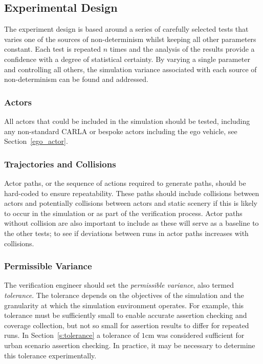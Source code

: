 \subsection{Experimental Design}\label{s:design_experiment}

The experiment design is based around a series of carefully selected tests that varies one of the sources of non-determinism whilst keeping all other parameters constant. Each test is repeated $n$ times and the analysis of the results provide a confidence with a degree of statistical certainty. By varying a single parameter and controlling all others, the simulation variance associated with each source of non-determinism can be found and addressed. 

\subsubsection{Actors} \label{s:actors}

All actors that could be included in the simulation should be tested, including any non-standard CARLA or bespoke actors including the ego vehicle, see Section~\ref{ego_actor}. 

\subsubsection{Trajectories and Collisions} 
Actor paths, or the sequence of actions required to generate paths, should be hard-coded to ensure repeatability. These paths should include collisions between actors and potentially collisions between actors and static scenery if this is likely to occur in the simulation or as part of the verification process. Actor paths without collision are also important to include as these will serve as a baseline to the other tests; to see if deviations between runs in actor paths increases with collisions. 

\subsubsection{Permissible Variance} \label{s:threshold}
The verification engineer should set the \textit{permissible variance}, also termed \textit{tolerance}.
The tolerance depends on the objectives of the simulation and the granularity at which the simulation environment operates. For example, this tolerance must be sufficiently small to enable accurate assertion checking and coverage collection, but not so small for assertion results to differ for repeated runs. In Section~\ref{s:tolerance} a tolerance of $1$cm was considered sufficient for urban scenario assertion checking. In practice, it may be necessary to determine this tolerance experimentally. 

